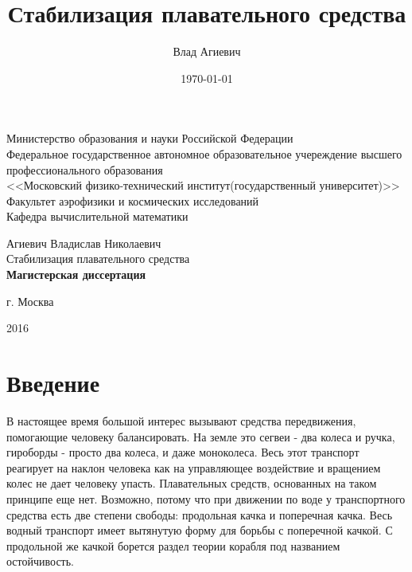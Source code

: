 \documentclass[a4paper]{article}
\title{Стабилизация плавательного средства}
\author{Влад Агиевич}
\date{\today}
\begin{document}
\begin{titlepage}

\begin{center}
Министерство образования и науки Российской Федерации \\
Федеральное государственное автономное образовательное учереждение высшего профессионального образования \\
<<Московский физико-технический институт(государственный университет)>> \\
Факультет аэрофизики и космических исследований \\
Кафедра вычислительной математики \\
\end{center}

\vspace{8mm}

\vspace{8mm}

\begin{center}
Агиевич Владислав Николаевич \\
{\large Стабилизация плавательного средства \\[8mm]
{\bf Магистерская диссертация\\}
}
\end{center}

\vspace{8mm}

\vspace{10mm}

\begin{center}
г. Москва
\end{center}
\begin{center}
2016
\end{center}
\end{titlepage}

\newpage

\tableofcontents

\newpage

\section{Введение} 

В настоящее время большой интерес вызывают средства передвижения, помогающие человеку балансировать. На земле это сегвеи - два колеса и ручка, гироборды - просто два колеса, и даже моноколеса. Весь этот транспорт реагирует на наклон человека как на управляющее воздействие и вращением колес не дает человеку упасть. Плавательных средств, основанных на таком принципе еще нет. Возможно, потому что при движении по воде у транспортного средства есть две степени свободы: продольная качка и поперечная качка. Весь водный транспорт имеет вытянутую форму для борьбы с поперечной качкой. С продольной же качкой борется раздел теории корабля под названием остойчивость. 
\end{document}
